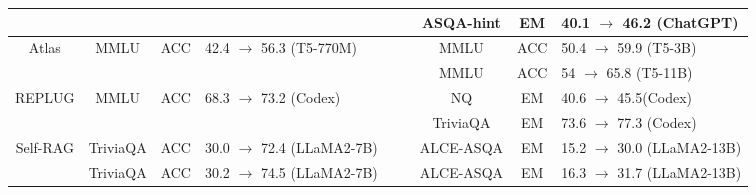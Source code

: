 \begin{table}[t]
\begin{adjustbox}{max width=\textwidth}
{\begin{tabular}{ccclc|c|ccl}
&&&&&& ASQA-hint & EM & 40.1 $\rightarrow$ 46.2 (ChatGPT) \\
\midrule
Atlas \citep{Atlas} & MMLU & ACC & 42.4 $\rightarrow$ 56.3 (T5-770M) &&& MMLU & ACC & 50.4 $\rightarrow$ 59.9 (T5-3B) \\
&&&&&& MMLU & ACC & 54 $\rightarrow$ 65.8 (T5-11B) \\
\midrule 
REPLUG \citep{REPLUG} & MMLU & ACC & 68.3 $\rightarrow$ 73.2 (Codex) &&& NQ & EM & 40.6 $\rightarrow$ 45.5(Codex) \\
&&&&&& TriviaQA & EM & 73.6 $\rightarrow$ 77.3 (Codex) \\
\midrule 
Self-RAG \citep{asai2023selfrag} & TriviaQA & ACC & 30.0 $\rightarrow$ 72.4 (LLaMA2-7B) &&& ALCE-ASQA & EM & 15.2 $\rightarrow$ 30.0 (LLaMA2-13B)\\
& TriviaQA & ACC &30.2 $\rightarrow$ 74.5 (LLaMA2-7B)&&&   ALCE-ASQA & EM & 16.3 $\rightarrow$ 31.7 (LLaMA2-13B) \\
\bottomrule
\end{tabular}
}
\end{adjustbox}
\end{table}